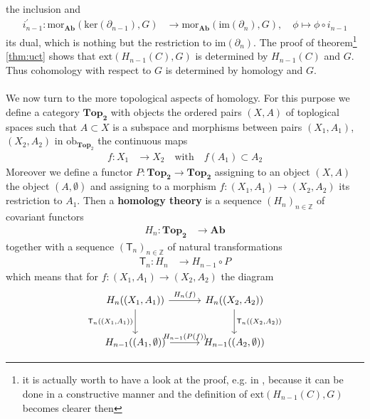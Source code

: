 the inclusion and
\begin{align*}
  i_{n-1}^{\prime}
  \colon
  \mathrm{mor}_{\mathbf{Ab}}(\mathrm{ker}(\partial_{n-1}),G)
  &\to
  \mathrm{mor}_{\mathbf{Ab}}(\mathrm{im}(\partial_{n}),G)
  ,\quad
  \phi
  \mapsto
  \phi
  \circ
  i_{n-1}
\end{align*}
its dual, which is nothing but the restriction to $\mathrm{im}(\partial_{n})$. The proof of theorem\footnote{it is actually worth to have a look at the proof, e.g. in \cite{8b5861fc}, because it can be done in a constructive manner and the definition of $\mathrm{ext}(H_{n-1}(C),G)$ becomes clearer then} \ref{thm:uct} shows that $\mathrm{ext}(H_{n-1}(C),G)$ is determined by $H_{n-1}(C)$ and $G$. Thus cohomology with respect to $G$ is determined by homology and $G$.
\\\\
We now turn to the more topological aspects of homology. For this purpose we define a category $\mathbf{Top_{2}}$ with objects the ordered pairs $(X,A)$ of toplogical spaces such that $A \subset X$ is a subspace and morphisms between pairs $(X_{1},A_{1})$, $(X_{2},A_{2})$ in $\mathrm{ob}_{\mathbf{Top}_{2}}$ the continuous maps
\begin{align*}
  f
  \colon
  X_{1}
  &\to
  X_{2}
  \quad
  \text{with}
  \quad
  f(A_{1})
  \subset
  A_{2}
\end{align*}
Moreover we define a functor $P \colon \mathbf{Top_{2}} \to \mathbf{Top_{2}}$ assigning to an object $(X,A)$ the object $(A,\emptyset)$ and assigning to a morphism $f \colon (X_{1},A_{1}) \to (X_{2},A_{2})$ its restriction to $A_{1}$. Then a \textbf{homology theory} is a sequence $(H_{n})_{n\in\mathbb{Z}}$ of covariant functors
\begin{align*}
  H_{n}
  \colon
  \mathbf{Top_{2}}
  &\to
  \mathbf{Ab}
\end{align*}
together with a sequence $(\mathsf{T}_{n})_{n\in\mathbb{Z}}$ of natural transformations
\begin{align*}
  \mathsf{T}_{n}
  \colon
  H_{n}
  &\to
  H_{n-1}
  \circ
  P
\end{align*}
which means that for $f \colon (X_{1},A_{1}) \to (X_{2},A_{2})$ the diagram
\begin{equation*}
\begin{tikzcd}[row sep=2.5em,column sep=3em]
  H_{n}((X_{1},A_{1}))
  \ar{r}{H_{n}(f)}
  \ar{d}[swap]{\mathsf{T}_{n}((X_{1},A_{1}))}
  &
  H_{n}((X_{2},A_{2}))
  \ar{d}{\mathsf{T}_{n}((X_{2},A_{2}))}
  \\
  H_{n-1}((A_{1},\emptyset))
  \ar{r}{H_{n-1}(P(f))}
  &
  H_{n-1}((A_{2},\emptyset))
\end{tikzcd}
\end{equation*}
